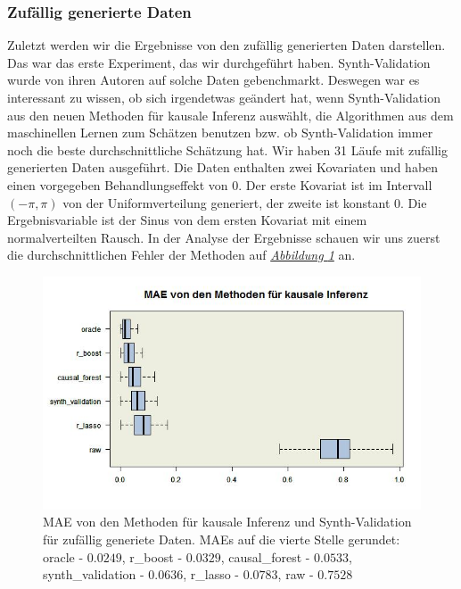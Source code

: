 \documentclass[12pt,a4paper,twoside]{scrartcl}
\numberwithin{equation}{section}
\newcommand{\reffig}[1]{\emph{\hyperref[#1]{Abbildung \ref*{#1}}}}
\begin{document}
\subsubsection{Zufällig generierte Daten}\label{subsubsec:ergebnisseZufälligGeneriertenDaten}
Zuletzt werden wir die Ergebnisse von den zufällig generierten Daten darstellen. Das war das erste Experiment, das wir durchgeführt haben. Synth-Validation wurde von ihren Autoren auf solche Daten gebenchmarkt. Deswegen war es interessant zu wissen, ob sich irgendetwas geändert hat, wenn Synth-Validation aus den neuen Methoden für kausale Inferenz auswählt, die Algorithmen aus dem maschinellen Lernen zum Schätzen benutzen bzw. ob Synth-Validation immer noch die beste durchschnittliche Schätzung hat. Wir haben 31 Läufe mit zufällig generierten Daten ausgeführt. Die Daten enthalten zwei Kovariaten und haben einen vorgegeben Behandlungseffekt von 0. Der erste Kovariat ist im Intervall $(- \pi,\pi )$ von der Uniformverteilung generiert, der zweite ist konstant 0. Die Ergebnisvariable ist der Sinus von dem ersten Kovariat mit einem normalverteilten Rausch. In der Analyse der Ergebnisse schauen wir uns zuerst die durchschnittlichen Fehler der Methoden auf \reffig{fig:randomBoxplot} an. 

\begin{center}
\begin{figure}[h]
    \centering
    \includegraphics[height=0.5\textwidth, width=1\textwidth]{figures/plots/randomBoxplot.jpeg}
    \caption[MAE von den Methoden für kausale Inferenz und Synth-Validation für zufällig generiete Daten]{MAE von den Methoden für kausale Inferenz und Synth-Validation für zufällig generiete Daten. MAEs auf die vierte Stelle gerundet: oracle - $0.0249$, r\_boost - $0.0329$, causal\_forest - $0.0533$, synth\_validation - $0.0636$, r\_lasso - $0.0783$, raw - $0.7528$}\label{fig:randomBoxplot}
  \end{figure}
\end{center}
\end{document}
